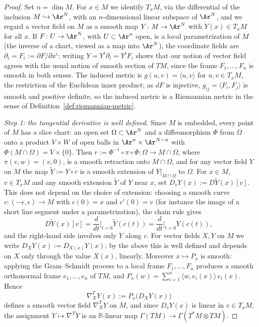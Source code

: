 \begin{proof}
Set $n=\dim M$. For $x\in M$ we identify $T_xM$, via the
differential of the inclusion $M\hookrightarrow\Ar^N$, with an
$n$-dimensional linear subspace of $\Ar^N$, and we regard a vector
field on $M$ as a smooth map $Y\colon M\to\Ar^N$ with $Y(x)\in
T_xM$ for all $x$. If $F\colon U\to\Ar^N$, with $U\subset\Ar^n$
open, is a local parametrization of $M$ (the inverse of a chart,
viewed as a map into $\Ar^N$), the coordinate fields are
$\partial_i=F_i:=\partial F/\partial x^i$; writing
$Y=Y^i\partial_i=Y^iF_i$ shows that our notion of vector field
agrees with the usual notion of smooth section of $TM$, since the
frame $F_1,\ldots,F_n$ is smooth in both senses. The induced
metric is $g(u,v)=\langle u,v\rangle$ for $u,v\in T_xM$, the
restriction of the Euclidean inner product; as $dF$ is injective,
$g_{ij}=\langle F_i,F_j\rangle$ is smooth and positive definite,
so the induced metric is a Riemannian metric in the sense of
Definition~\ref{def:riemannian-metric}.

\emph{Step 1: the tangential derivative is well defined.} Since
$M$ is embedded, every point of $M$ has a slice chart: an open set
$\Omega\subset\Ar^N$ and a diffeomorphism $\Phi$ from $\Omega$
onto a product $V\times W$ of open balls in
$\Ar^n\times\Ar^{N-n}$ with $\Phi(M\cap\Omega)=V\times\{0\}$.
Then $r:=\Phi^{-1}\circ\pi\circ\Phi\colon\Omega\to M\cap\Omega$,
where $\pi(v,w)=(v,0)$, is a smooth retraction onto $M\cap\Omega$,
and for any vector field $Y$ on $M$ the map $\widetilde Y:=Y\circ
r$ is a smooth extension of $Y|_{M\cap\Omega}$ to $\Omega$. For
$x\in M$, $v\in T_xM$ and any smooth extension $\widetilde Y$ of
$Y$ near $x$, set $D_vY(x):=D\widetilde Y(x)[v]$. This does not
depend on the choice of extension: choosing a smooth curve
$c\colon(-\epsilon,\epsilon)\to M$ with $c(0)=x$ and $c'(0)=v$
(for instance the image of a short line segment under a
parametrization), the chain rule gives
$$D\widetilde Y(x)[v]=\frac{d}{dt}\Big|_{t=0}\widetilde Y(c(t))
=\frac{d}{dt}\Big|_{t=0}Y(c(t)),$$
and the right-hand side involves only $Y$ along $c$. For vector
fields $X,Y$ on $M$ we write $D_XY(x):=D_{X(x)}Y(x)$; by the
above this is well defined and depends on $X$ only through the
value $X(x)$, linearly. Moreover $x\mapsto P_x$ is smooth:
applying the Gram--Schmidt process to a local frame
$F_1,\ldots,F_n$ produces a smooth orthonormal frame
$e_1,\ldots,e_n$ of $TM$, and
$P_x(w)=\sum_{i=1}^n\langle w,e_i(x)\rangle\,e_i(x)$. Hence
$$\nabla^T_XY(x):=P_x\bigl(D_XY(x)\bigr)$$
defines a smooth vector field $\nabla^T_XY$ on $M$, and since
$D_vY(x)$ is linear in $v\in T_xM$, the assignment
$Y\mapsto\nabla^TY$ is an $\mathbb{R}$-linear map
$\Gamma(TM)\to\Gamma(T^*M\otimes TM)$.


\end{proof}
